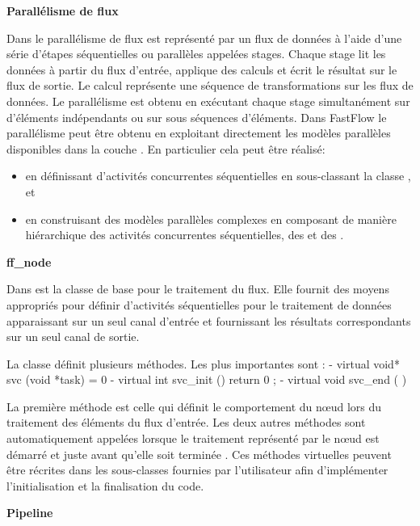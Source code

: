 \textbf{Parall\'elisme de flux}

Dans  le parall\'elisme de flux est repr\'esent\'e par un flux de donn\'ees \`a l'aide d'une s\'erie d'\'etapes s\'equentielles ou parall\`eles appel\'ees stages. Chaque stage lit les donn\'ees \`a partir du flux d'entr\'ee, applique des calculs et \'ecrit le r\'esultat sur le flux de sortie. Le calcul repr\'esente une s\'equence de transformations sur les flux de donn\'ees. Le parall\'elisme est obtenu en ex\'ecutant chaque stage simultan\'ement sur d'\'el\'ements ind\'ependants ou sur sous s\'equences d'\'el\'ements. Dans FastFlow le parall\'elisme peut \^etre obtenu en exploitant directement les mod\`eles parall\`eles disponibles dans la couche . En particulier cela peut \^etre r\'ealis\'e:

\begin{itemize}
\item en d\'efinissant d'activit\'es concurrentes s\'equentielles en sous-classant la classe , et
\item en construisant des mod\`eles parall\`eles complexes en composant de mani\`ere hi\'erarchique des activit\'es concurrentes s\'equentielles, des  et des .
\end{itemize}

\textbf{ff\_node}

Dans  est la classe de base pour le traitement du flux. Elle fournit des moyens appropri\'es pour d\'efinir d'activit\'es s\'equentielles pour le traitement de données apparaissant sur un seul canal d'entr\'ee et fournissant les r\'esultats correspondants sur un seul canal de sortie. 

La classe  d\'efinit plusieurs m\'ethodes. Les plus importantes sont :
- virtual void*  svc (void *task) = 0
- virtual int svc\_init () { return 0 ; } 
- virtual void svc\_end ( ) {} 

La premi\`ere m\'ethode est celle qui d\'efinit le comportement du nœud lors du traitement des \'el\'ements du flux d'entr\'ee. Les deux autres m\'ethodes sont automatiquement appel\'ees lorsque le traitement repr\'esent\'e par le nœud est d\'emarr\'e  et juste avant qu'elle soit termin\'ee . Ces m\'ethodes virtuelles peuvent \^etre r\'ecrites dans les sous-classes  fournies par l'utilisateur afin d'impl\'ementer l'initialisation et la finalisation du code.


\textbf{Pipeline}

